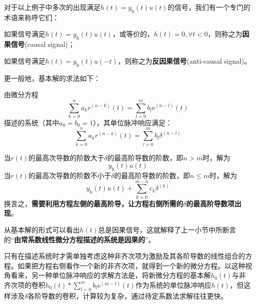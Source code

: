 对于以上例子中多次的出现满足$h(t)=y_\text{h}(t)u(t)$的信号，我们有一个专门的术语来称呼它们：

\begin{definition}
    \label{def:casual_signal}
    如果信号满足$h(t)=y_\text{h}(t)u(t)$，或等价的，$h(t)=0,\forall t<0$，则称之为\textbf{因果信号}(causal signal)；
    
    如果信号满足$h(t)=y_\text{h}(t)u(-t)$，则称之为\textbf{反因果信号}(anti-causal signal)。
\end{definition}

更一般地，基本解的求法如下：
\begin{theorem}
    由微分方程
    \[\sum_{k=0}^{n}a_{k} r^{(n-k)}(t)=\sum_{l=0}^{m}b_{l} \mathrm{e}^{(n-l)}(t)\]
    描述的系统（其中$a_0=b_0=1$），其单位脉冲响应满足：
    \[\sum_{k=0}^{n}a_{k} r^{(n-k)}(t)=\sum_{l=0}^{m}b_{l} \delta^{(n-l)}\]
\end{theorem}
当$r(t)$的最高次导数的阶数大于$\delta$的最高阶导数的阶数，即$n>m$时，解为
$$y_{\text{h}}(t)u(t)$$
当$r(t)$的最高次导数的阶数不小于$\delta$的最高阶导数的阶数，即$n\leq m$时，解为
$$y_{\text{h}}(t)u(t)+\sum_{k=0}^{m-n}c_k \delta^{(k)}$$
换言之，\textbf{需要利用方程左侧的最高阶导，让方程右侧所需的$\delta$的最高阶导数项出现}。

从基本解的形式可以看出$h(t)$总是因果信号，这就解释了上一小节中所断言的“\textbf{由常系数线性微分方程描述的系统是因果的}”。

只有在描述系统时才需单独考虑这种非齐次项为激励及其各阶导数的线性组合的方程。如果把方程右侧看作一个新的非齐次项，就得到一个新的微分方程。以这种视角看来，另一种单位脉冲响应的求解方法是，将新微分方程的基本解$h_0(t)$与非齐次项的卷积$h_0(t)*\sum_{l=0}^{m}b_l \mathrm{e}^{(m-l)}(t)$作为系统的单位脉冲响应$h(t)$，但这样涉及$\delta$各阶导数的卷积，计算较为复杂，通过待定系数法求解往往更快。

